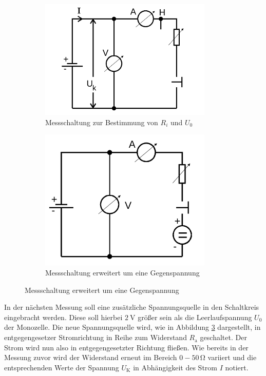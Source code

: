\begin{figure}
\centering
\begin{subfigure}{0.53\textwidth}
\centering
\includegraphics[width=0.9\textwidth]{Bilder/Abbildung2.png}
\caption{Messschaltung zur Bestimmung von $R_i$ und $U_0$ \cite{Anleitung}}
\label{fig:abbildung2}
\end{subfigure}
\begin{subfigure}{0.45\textwidth}
\centering
\includegraphics[width=0.9\textwidth]{Bilder/Abbildung3.png}
\caption{Messschaltung  erweitert um eine Gegenspannung \cite{Anleitung}}
\label{fig:abbildung3}
\end{subfigure}
\end{figure}
In der nächsten Messung soll eine zusätzliche Spannungsquelle in den Schaltkreis eingebracht werden.
Diese soll hierbei $\SI{2}{\volt}$ größer sein als die Leerlaufspannung $U_0$ der Monozelle.
Die neue Spannungsquelle wird, wie in Abbildung \ref{fig:abbildung3} dargestellt, in entgegengesetzer Stromrichtung in Reihe zum Widerstand $R_{\text{a}}$ geschaltet.
Der Strom wird nun also in entgegengesetzter Richtung fließen. Wie bereits in der Messung zuvor wird der Widerstand erneut im Bereich $0-50 \, \si{\ohm}$ variiert und die entsprechenden Werte der Spannung $U_{\text{K}}$ in Abhängigkeit des Strom $I$ notiert.

